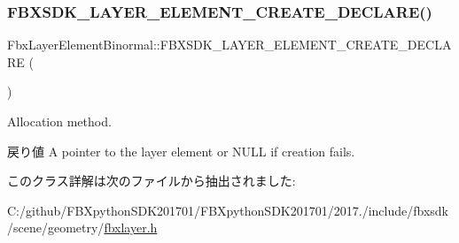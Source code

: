 \subsubsection{\texorpdfstring{F\+B\+X\+S\+D\+K\+\_\+\+L\+A\+Y\+E\+R\+\_\+\+E\+L\+E\+M\+E\+N\+T\+\_\+\+C\+R\+E\+A\+T\+E\+\_\+\+D\+E\+C\+L\+A\+R\+E()}{FBXSDK\_LAYER\_ELEMENT\_CREATE\_DECLARE()}}
{\footnotesize\ttfamily Fbx\+Layer\+Element\+Binormal\+::\+F\+B\+X\+S\+D\+K\+\_\+\+L\+A\+Y\+E\+R\+\_\+\+E\+L\+E\+M\+E\+N\+T\+\_\+\+C\+R\+E\+A\+T\+E\+\_\+\+D\+E\+C\+L\+A\+RE (\begin{DoxyParamCaption}\item[{Layer\+Element\+Binormal}]{ }\end{DoxyParamCaption})}

Allocation method. \begin{DoxyReturn}{戻り値}
A pointer to the layer element or {\ttfamily N\+U\+LL} if creation fails. 
\end{DoxyReturn}


このクラス詳解は次のファイルから抽出されました\+:\begin{DoxyCompactItemize}
\item 
C\+:/github/\+F\+B\+Xpython\+S\+D\+K201701/\+F\+B\+Xpython\+S\+D\+K201701/2017./include/fbxsdk/scene/geometry/\hyperlink{fbxlayer_8h}{fbxlayer.\+h}\end{DoxyCompactItemize}
